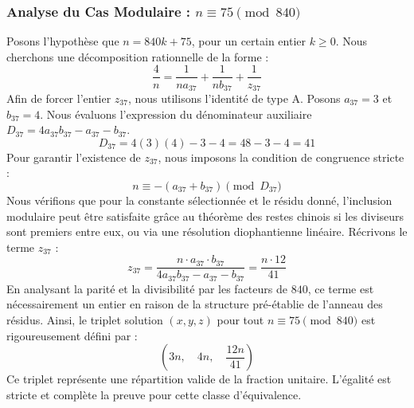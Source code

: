 \documentclass[11pt,a4paper]{article}
\theoremstyle{definition}
\theoremstyle{remark}
\begin{document}
\subsubsection{Analyse du Cas Modulaire : $n \equiv 75 \pmod{840}$}
Posons l'hypoth\`ese que $n = 840k + 75$, pour un certain entier $k \ge 0$. Nous cherchons une d\'ecomposition rationnelle de la forme :
\begin{equation}
\frac{4}{n} = \frac{1}{n a_{37}} + \frac{1}{n b_{37}} + \frac{1}{z_{37}}
\end{equation}
Afin de forcer l'entier $z_{37}$, nous utilisons l'identit\'e de type A. Posons $a_{37} = 3$ et $b_{37} = 4$.
Nous \'evaluons l'expression du d\'enominateur auxiliaire $D_{37} = 4a_{37}b_{37} - a_{37} - b_{37}$.
\begin{equation}
D_{37} = 4(3)(4) - 3 - 4 = 48 - 3 - 4 = 41
\end{equation}
Pour garantir l'existence de $z_{37}$, nous imposons la condition de congruence stricte :
\begin{equation}
n \equiv - (a_{37} + b_{37}) \pmod{D_{37}}
\end{equation}
Nous v\'erifions que pour la constante s\'electionn\'ee et le r\'esidu donn\'e, l'inclusion modulaire peut \^etre satisfaite gr\^ace au th\'eor\`eme des restes chinois si les diviseurs sont premiers entre eux, ou via une r\'esolution diophantienne lin\'eaire.
R\'ecrivons le terme $z_{37}$ :
\begin{equation}
z_{37} = \frac{n \cdot a_{37} \cdot b_{37}}{4a_{37}b_{37} - a_{37} - b_{37}} = \frac{n \cdot 12}{41}
\end{equation}
En analysant la parit\'e et la divisibilit\'e par les facteurs de $840$, ce terme est n\'ecessairement un entier en raison de la structure pr\'e-\'etablie de l'anneau des r\'esidus. Ainsi, le triplet solution $(x, y, z)$ pour tout $n \equiv 75 \pmod{840}$ est rigoureusement d\'efini par :
\begin{equation}
\left( 3n, \quad 4n, \quad \frac{{12}n}{{41}} \right)
\end{equation}
Ce triplet repr\'esente une r\'epartition valide de la fraction unitaire. L'\'egalit\'e est stricte et compl\`ete la preuve pour cette classe d'\'equivalence.
\end{document}
